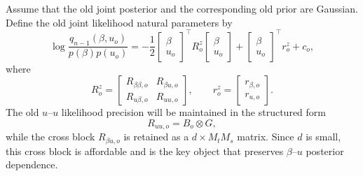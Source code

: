 \documentclass[12pt]{article}
\begin{document}
Assume that the old joint posterior and the corresponding old prior are
Gaussian. Define the old joint likelihood natural parameters by
\begin{equation}
    \log
    \frac{q_{n-1}(\beta,u_o)}{p(\beta)p(u_o)}
    =
    -\frac{1}{2}
    \begin{bmatrix}\beta\\u_o\end{bmatrix}^{\!\top}
    R_o^z
    \begin{bmatrix}\beta\\u_o\end{bmatrix}
    +
    \begin{bmatrix}\beta\\u_o\end{bmatrix}^{\!\top}
    r_o^z
    +c_o,
    \label{eq:joint_old_likelihood_ratio}
\end{equation}
where
\begin{equation}
    R_o^z
    =
    \begin{bmatrix}
        R_{\beta\beta,o} & R_{\beta u,o}\\
        R_{u\beta,o} & R_{uu,o}
    \end{bmatrix},
    \qquad
    r_o^z=
    \begin{bmatrix}
        r_{\beta,o}\\r_{u,o}
    \end{bmatrix}.
    \label{eq:joint_old_natural_blocks}
\end{equation}
The old $u$--$u$ likelihood precision will be maintained in the structured form
\begin{equation}
    R_{uu,o}=B_o\otimes G,
    \label{eq:joint_old_Ruu_kron}
\end{equation}
while the cross block $R_{\beta u,o}$ is retained as a $d\times M_tM_s$ matrix.
Since $d$ is small, this cross block is affordable and is the key object that
preserves $\beta$--$u$ posterior dependence.
\end{document}
